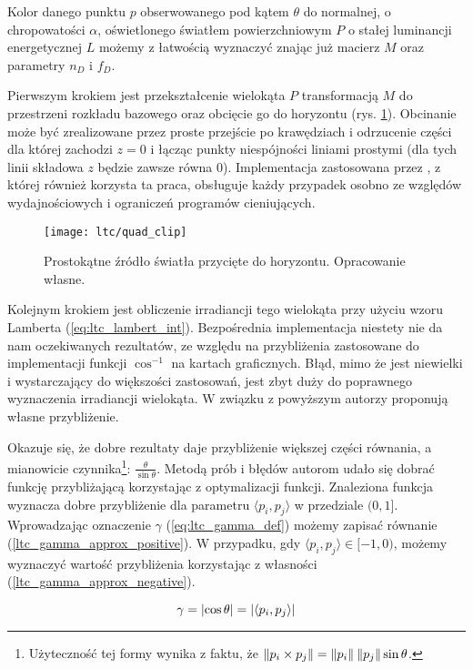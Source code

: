 \documentclass[../main.tex]{subfiles}
\begin{document}
Kolor danego punktu $p$ obserwowanego pod kątem $\theta$ do normalnej, o chropowatości $\alpha$, oświetlonego światłem powierzchniowym $P$ o stałej luminancji energetycznej $L$ możemy z łatwością wyznaczyć znając już macierz $M$ oraz parametry $n_D$ i $f_D$.

Pierwszym krokiem jest przekształcenie wielokąta $P$ transformacją $M$ do przestrzeni rozkładu bazowego oraz obcięcie go do horyzontu (rys. \ref{fig:QuadClip}). Obcinanie może być zrealizowane przez proste przejście po krawędziach i odrzucenie części dla której zachodzi $z=0$ i łącząc punkty niespójności liniami prostymi (dla tych linii składowa $z$ będzie zawsze równa $0$). Implementacja zastosowana przez \cite{ltc_heitz}, z której również korzysta ta praca, obsługuje każdy przypadek osobno ze względów wydajnościowych i ograniczeń programów cieniujących.

\begin{figure}[h]
    \centering
    \texttt{[image: ltc/quad\_clip]}
    \caption{Prostokątne źródło światła przycięte do horyzontu. Opracowanie własne.}
    \label{fig:QuadClip}
\end{figure}

Kolejnym krokiem jest obliczenie irradiancji tego wielokąta przy użyciu wzoru   Lamberta (\ref{eq:ltc_lambert_int}). Bezpośrednia implementacja niestety nie da nam oczekiwanych rezultatów, ze względu na przybliżenia zastosowane do implementacji funkcji $\cos^{-1}$ na kartach graficznych. Błąd, mimo że jest niewielki i wystarczający do większości zastosowań, jest zbyt duży do poprawnego wyznaczenia irradiancji wielokąta. W związku z powyższym autorzy \cite{LTCJourneyPresentation} proponują własne przybliżenie.

Okazuje się, że dobre rezultaty daje przybliżenie większej części równania, a mianowicie czynnika\footnote{Użyteczność tej formy wynika z faktu, że $\norm{p_i \times p_j} = \norm{p_i}\:\norm{p_j}\sin\theta$.}: $\frac{\theta}{\sin\theta}$. Metodą prób i błędów autorom udało się dobrać funkcję przybliżającą korzystając z optymalizacji funkcji. Znaleziona funkcja wyznacza dobre przybliżenie dla parametru $\langle p_i, p_j \rangle$ w przedziale $(0,1]$. Wprowadzając oznaczenie $\gamma$ (\ref{eq:ltc_gamma_def}) możemy zapisać równanie (\ref{ltc_gamma_approx_positive}). W przypadku, gdy $\langle p_i, p_j \rangle \in [-1, 0)$, możemy wyznaczyć wartość przybliżenia korzystając z własności (\ref{ltc_gamma_approx_negative}).

\begin{equation}
\gamma = \abs{\cos\theta} = \abs{\langle p_i, p_j \rangle}
\label{eq:ltc_gamma_def}
\end{equation}
\end{document}
